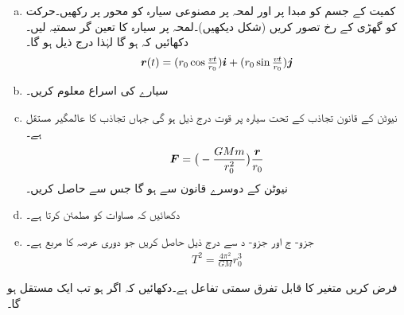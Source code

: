 \begin{enumerate}[a.]
\item
کمیت  کے جسم کو مبدا پر   اور لمحہ  پر   مصنوعی سیارہ کو محور   پر رکھیں۔حرکت کو گھڑی کے رخ تصور کریں (شکل دیکھیں)۔لمحہ  پر سیارہ کا تعین گر سمتیہ  لیں۔ دکھائیں کہ  ہو گا  لہٰذا درج ذیل  ہو گا۔
\begin{align*}
{\ensuremath{{\boldsymbol{r}}}}(t)=(r_0\cos\tfrac{vt}{r_0}){\boldsymbol{i}}+(r_0\sin\tfrac{vt}{r_0}){\boldsymbol{j}}
\end{align*}
\item
سیارے کی اسراع معلوم کریں۔
\item
نیوٹن کے قانون تجاذب  کے تحت سیارہ پر قوت درج ذیل ہو گی جہاں   تجاذب کا عالمگیر مستقل ہے۔
\begin{align*}
{\ensuremath{{\boldsymbol{F}}}}=\big(-\frac{GMm}{r_0^2}\big)\frac{{{\boldsymbol{r}}}}{r_0}
\end{align*}
نیوٹن کے دوسرے قانون سے  ہو گا  جس سے  حاصل کریں۔ 
\item
دکھائیں کہ مساوات  کو مطمئن کرتا ہے۔
\item
جزو- ج اور جزو- د سے درج ذیل حاصل کریں جو دوری عرصہ کا مربع ہے۔
\begin{align*}
T^2=\frac{4\pi^2}{GM}r_0^3
\end{align*}
\end{enumerate}
%
\begin{center}
\end{center}
فرض کریں  متغیر  کا قابل تفرق سمتی تفاعل ہے۔دکھائیں کہ اگر  ہو تب  ایک مستقل ہو گا۔
\\
